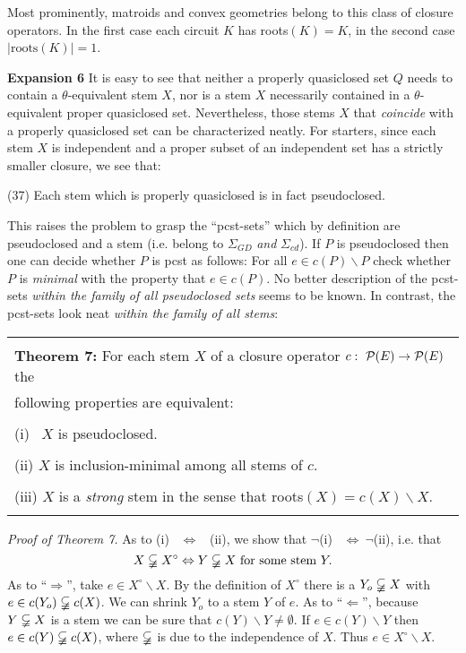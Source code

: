 \documentclass[11pt]{article}
\newcommand{\ra}{\rightarrow}
\newcommand{\Ra}{\Rightarrow}
\begin{document}
Most prominently, matroids and convex geometries belong to this class of closure operators. In the first case each circuit $K$ has roots$(K) = K$, in the second case $|\mbox{roots}(K)| =1$.



{\bf Expansion 6} It is easy to see that neither a properly quasiclosed set $Q$ needs to contain a $\theta$-equivalent stem $X$, nor is a stem $X$ necessarily contained in a $\theta$-equivalent proper quasiclosed set. Nevertheless, those stems $X$ that {\it coincide} with a properly quasiclosed set can be characterized neatly. For starters, since each stem $X$ is independent and a proper subset of an independent set has a strictly smaller closure, we see that:

(37) \quad Each stem which is properly quasiclosed is in fact pseudoclosed.

This raises the problem to grasp the ``pcst-sets'' which by definition are pseudoclosed and a stem (i.e. belong to $\Sigma_{GD}$ {\it and} $\Sigma_{cd}$). If $P$ is pseudoclosed then one can decide whether $P$ is pcst as follows: For all $e \in c(P)\backslash P$ check whether $P$ is {\it minimal} with the property that $e \in c(P)$. No better description of the pcst-sets {\it within the family of all pseudoclosed sets} seems to be known. In contrast, the pcst-sets look neat {\it within the family of all stems}:

\begin{tabular}{|l|} \hline \\
{\bf Theorem 7:} For each stem $X$ of a closure operator $c: \ {\cal P}(E) \ra {\cal P}(E)$ the \\
following properties are equivalent:\\
\\
(i) \ $X$ is pseudoclosed.\\
\\
(ii) $X$ is inclusion-minimal among all stems of $c$.\\
\\
(iii) $X$ is a {\it strong} stem in the sense that roots$(X) = c(X) \backslash X$.\\ \\ \hline \end{tabular}


{\it Proof of Theorem 7.}
As to (i) \ $\Leftrightarrow$ \ (ii), we show that $\neg$(i) \ $\Leftrightarrow \ \neg$(ii), i.e. that
$$X \varsubsetneqq X^\circ \Leftrightarrow Y \varsubsetneqq X \ \mbox{for some stem} \ Y.$$
As to ``$\Ra$'', take $e \in X^\circ \backslash X$. By the definition of $X^\circ$ there is a $Y_o \varsubsetneqq X$ with $e \in c(Y_o) \varsubsetneqq c(X)$. We can shrink $Y_o$ to a stem $Y$ of $e$. As to ``$\Leftarrow$'', because $Y \varsubsetneqq X$ is a stem we can be sure that $c(Y) \backslash Y \neq \emptyset$. If $e \in c(Y) \backslash Y$ then $e \in c(Y) \varsubsetneqq c(X)$, where $\varsubsetneqq$ is due to the independence of $X$. Thus $e \in X^\circ \backslash X$.
\end{document}
